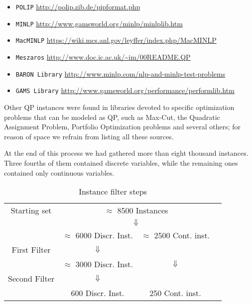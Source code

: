 \begin{itemize}
 \item {\tt POLIP} \url{http://polip.zib.de/pipformat.php}
 \item {\tt MINLP} \url{http://www.gamsworld.org/minlp/minlplib.htm}
 \item {\tt MacMINLP} \url{https://wiki.mcs.anl.gov/leyffer/index.php/MacMINLP}
 \item {\tt Meszaros} \url{http://www.doc.ic.ac.uk/~im/00README.QP}
 \item {\tt BARON Library} \url{http://www.minlp.com/nlp-and-minlp-test-problems}
 \item {\tt GAMS Library} \url{http://www.gamsworld.org/performance/performlib.htm}
\end{itemize}
%
Other QP instances were found in libraries devoted to specific optimization problems that can be modeled as QP, such as Max-Cut, the Quadratic Assignment Problem, Portfolio Optimization problems and several others; for reason of space we refrain from listing all these sources.

At the end of this process we had gathered more than eight thousand instances. Three fourths of them contained discrete variables, while the remaining ones contained only continuous variables.

\begin{center}
\begin{table}[]
 \centering

 \setlength{\tabcolsep}{5pt}
\begin{tabular}{cccc}
Starting set& \multicolumn{ 2}{c}{ $\approx$ 8500 Instances }& \\
& \multicolumn{ 2}{c}{$\Downarrow$}& \\
& $\approx$ 6000 Discr. Inst.  & $\approx$ 2500 Cont. inst. & \\
First Filter  & $\Downarrow$  &  & \\
 & $\approx$ 3000 Discr. Inst.  & $\Downarrow$ & \\
Second Filter & $\Downarrow$  &  & \\
 & 600 Discr. Inst.  & 250  Cont. inst. & \\
\end{tabular}
\caption{Instance filter steps} \label{tab:filters}
\end{table}
\end{center}

